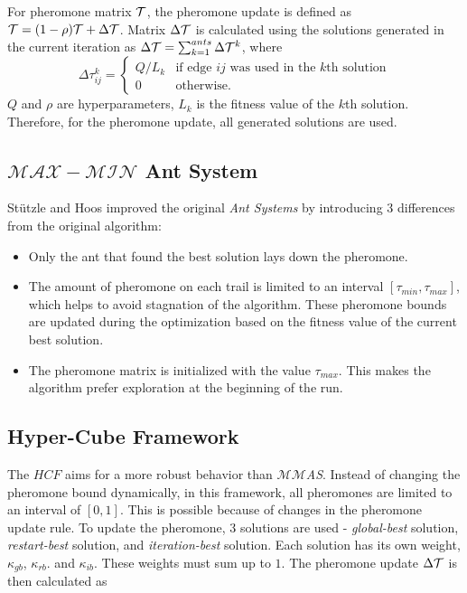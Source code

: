 For pheromone matrix $\mathcal{T}$, the pheromone update is defined as $\mathcal{T} = (1 - \rho)\mathcal{T} + \Delta\mathcal{T}$. Matrix $\Delta\mathcal{T}$ is calculated using the solutions generated in the current iteration as $\Delta\mathcal{T} = \sum_{k=1}^{ants} \Delta\mathcal{T}^k$, where
\begin{equation}
    \Delta\tau_{ij}^{k} = 
        \begin{cases}
        Q / L_k & \text{if edge $ij$ was used in the $k$th solution} \\
        0 & \text{otherwise}.
        \end{cases}
\end{equation}
$Q$ and $\rho$ are hyperparameters, $L_k$ is the fitness value of the $k$th solution. Therefore, for the pheromone update, all generated solutions are used. 

\subsection{\texorpdfstring{$\mathcal{MAX}\!{-}\!\mathcal{MIN}$}{MAX-MIN} Ant System}

Stützle and Hoos improved the original \textit{Ant Systems} by introducing 3 differences from the original algorithm:
\begin{itemize}
    \item Only the ant that found the best solution lays down the pheromone.
    \item The amount of pheromone on each trail is limited to an interval $[\tau_{min}, \tau_{max}]$, which helps to avoid stagnation of the algorithm. These pheromone bounds are updated during the optimization based on the fitness value of the current best solution.
    \item The pheromone matrix is initialized with the value $\tau_{max}$. This makes the algorithm prefer exploration at the beginning of the run.
\end{itemize}

\subsection{Hyper-Cube Framework}
 
The $HCF$ aims for a more robust behavior than \textit{$\mathcal{MM}$AS}. Instead of changing the pheromone bound dynamically, in this framework, all pheromones are limited to an interval of $[0, 1]$. This is possible because of changes in the pheromone update rule. To update the pheromone, 3 solutions are used - \textit{global-best} solution, \textit{restart-best} solution, and \textit{iteration-best} solution. Each solution has its own weight, $\kappa_{gb}$, $\kappa_{rb}$. and $\kappa_{ib}$. These weights must sum up to $1$. The pheromone update $\Delta\mathcal{T}$ is then calculated as

